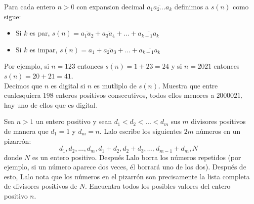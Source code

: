 \documentclass[11pt]{scrartcl}
\begin{document}
\begin{problem}
[2021/5] Para cada entero $n>0$ con expansion decimal $\overline{a_1a_2\ldots a_k}$ definimos a $s(n)$ como sigue:
\begin{itemize}
\item Si $k$ es par, $s(n)=\overline{a_1a_2}+\overline{a_3a_4}+\ldots+\overline{a_{k-1}a_k}$
\item Si $k$ es impar, $s(n)=a_1+\overline{a_2a_3}+\ldots+\overline{a_{k-1}a_k}$
\end{itemize}
Por ejemplo, si $n=123$ entonces $s(n)=1+23=24$ y si $n=2021$ entonces $s(n)=20+21=41$.\\
Decimos que $n$ es digital si $n$ es mutliplo de $s(n)$. Muestra que entre cualesquiera $198$ enteros positivos consecutivos, todos ellos menores a $2000021$, hay uno de ellos que es digital.
\end{problem}
\begin{problem}
    [2022/5] 
    Sea $n>1$ un entero positivo y sean $d_1< d_2< \dots< d_m$ sus $m$ divisores positivos de manera que $d_1=1$ y $d_m=n$. Lalo escribe los siguientes $2m$ números en un pizarrón:
\[d_1,d_2,\dots,d_m,d_1+d_2,d_2+d_3,\dots,d_{m-1}+d_m,N\]
donde $N$ es un entero positivo. Después Lalo borra los números repetidos (por ejemplo, si un número aparece dos veces, él borrará uno de los dos). Después de esto, Lalo nota que los números en el pizarrón son precisamente la lista completa de divisores positivos de $N$. Encuentra todos los posibles valores del entero positivo $n$.
    
\end{problem}
\end{document}
